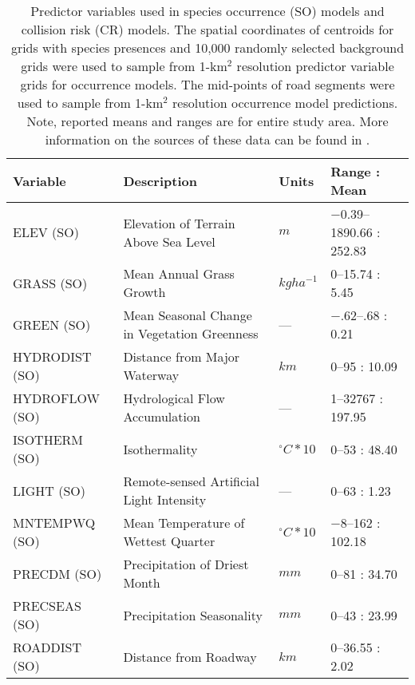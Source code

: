 \begin{table}[!t]
\caption[Predictor variables used in species occurrence models and collision risk models]{Predictor variables used in species occurrence (SO) models and collision risk (CR) models. The spatial coordinates of centroids for grids with species presences and 10,000 randomly selected background grids were used to sample from 1-km$^2$ resolution predictor variable grids for occurrence models. The mid-points of road segments were used to sample from 1-km$^2$ resolution occurrence model predictions. Note, reported means and ranges are for entire study area. More information on the sources of these data can be found in .}
\centering
\renewcommand{\arraystretch}{1.5}
\begin{tabularx}{0.9\textwidth}{@{}lYll@{}} \toprule
Variable       &Description                                               &Units          &Range : Mean\\
\midrule 
ELEV (SO)       &Elevation of Terrain Above Sea Level                     &$m$			  &$-$0.39--1890.66 : 252.83\\
GRASS (SO)      &Mean Annual Grass Growth \citep{cart03}	              &$kg ha^{-1}$   &0--15.74 : 5.45\\
GREEN (SO)      &Mean Seasonal Change in Vegetation Greenness             &---            &$-$.62--.68 : 0.21\\
HYDRODIST (SO)  &Distance from Major Waterway                             &$km$           &0--95 : 10.09\\
HYDROFLOW (SO)  &Hydrological Flow Accumulation                           &---            &1--32767 : 197.95\\
ISOTHERM (SO)   &Isothermality                                            &$^{\circ}C*10$ &0--53 : 48.40\\
LIGHT (SO)      &Remote-sensed Artificial Light Intensity                 &---            &0--63 : 1.23\\
MNTEMPWQ (SO)   &Mean Temperature of Wettest Quarter                      &$^{\circ}C*10$ &$-$8--162 : 102.18\\
PRECDM (SO)     &Precipitation of Driest Month                            &$mm$           &0--81 : 34.70\\
PRECSEAS (SO)   &Precipitation Seasonality                                &$mm$           &0--43 : 23.99\\
ROADDIST (SO)   &Distance from Roadway                                    &$km$           &0--36.55 : 2.02\\

\end{tabularx}
\end{table}
